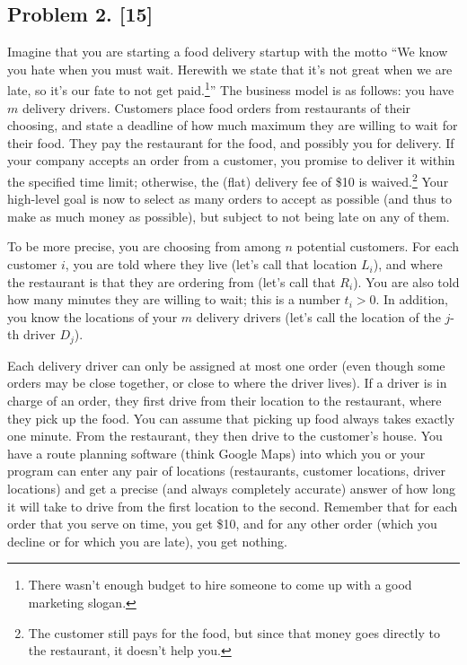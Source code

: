 \documentclass[10pt]{article}
\begin{document}
\subsection*{Problem 2. [15]}
Imagine that you are starting a food delivery startup with the motto ``We know you hate when you must wait. Herewith we state that it's not great when we are late, so it's our fate to not get paid.\footnote{There wasn't enough budget to hire someone to come up with a good marketing slogan.}''
The business model is as follows: you have $m$ delivery drivers. Customers place food orders from restaurants of their choosing, and state a deadline of how much maximum they are willing to wait for their food. They pay the restaurant for the food, and possibly you for delivery. If your company accepts an order from a customer, you promise to deliver it within the specified time limit; otherwise, the (flat) delivery fee of \$10 is waived.\footnote{The customer still pays for the food, but since that money goes directly to the restaurant, it doesn't help you.} Your high-level goal is now to select as many orders to accept as possible (and thus to make as much money as possible), but subject to not being late on any of them.

To be more precise, you are choosing from among $n$ potential customers. For each customer $i$, you are told where they live (let's call that location $L_i$), and where the restaurant is that they are ordering from (let's call that $R_i$). You are also told how many minutes they are willing to wait; this is a number $t_i > 0$. In addition, you know the locations of your $m$ delivery drivers (let's call the location of the $j$-th driver $D_j$).

Each delivery driver can only be assigned at most one order (even though some orders may be close together, or close to where the driver lives).
If a driver is in charge of an order, they first drive from their location to the restaurant, where they pick up the food. You can assume that picking up food always takes exactly one minute. From the restaurant, they then drive to the customer's house.
You have a route planning software (think Google Maps) into which you or your program can enter any pair of locations (restaurants, customer locations, driver locations) and get a precise (and always completely accurate) answer of how long it will take to drive from the first location to the second.
Remember that for each order that you serve on time, you get \$10, and for any other order (which you decline or for which you are late), you get nothing.
\end{document}

